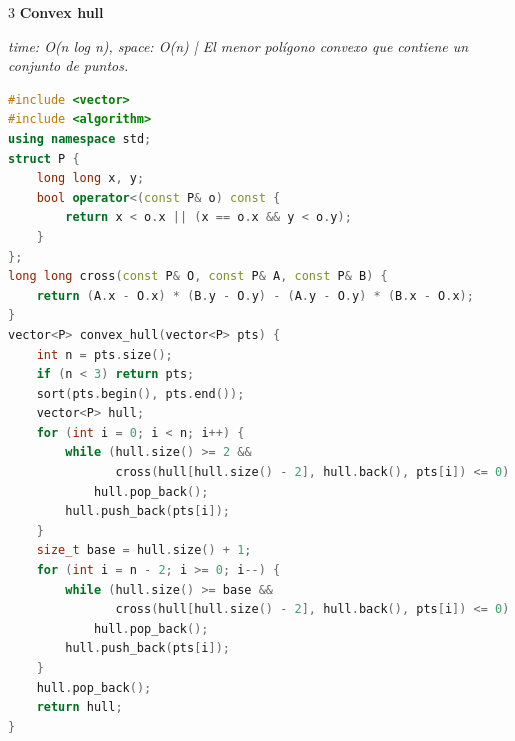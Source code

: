 \documentclass[8pt,a4paper,landscape]{extarticle}
\makeatletter
\newcommand{\csalgo}[1]{%
  \vspace{0.8ex}%
  {\bfseries\small #1}\par
  \vspace{0.4ex}{\color{cs@rule}\hrule height 0.4pt}\vspace{0.5ex}%
}
\newcommand{\csstats}[1]{{\scriptsize\itshape #1\par\vspace{0.3ex}}}
\makeatother
\begin{document}
\begin{multicols}{3}
\csalgo{Convex hull}
\csstats{time: O(n log n), space: O(n)  |  El menor polígono convexo que contiene un conjunto de puntos.}
\begin{lstlisting}[language=C++]
#include <vector>
#include <algorithm>
using namespace std;
struct P {
    long long x, y;
    bool operator<(const P& o) const {
        return x < o.x || (x == o.x && y < o.y);
    }
};
long long cross(const P& O, const P& A, const P& B) {
    return (A.x - O.x) * (B.y - O.y) - (A.y - O.y) * (B.x - O.x);
}
vector<P> convex_hull(vector<P> pts) {
    int n = pts.size();
    if (n < 3) return pts;
    sort(pts.begin(), pts.end());
    vector<P> hull;
    for (int i = 0; i < n; i++) {
        while (hull.size() >= 2 &&
               cross(hull[hull.size() - 2], hull.back(), pts[i]) <= 0)
            hull.pop_back();
        hull.push_back(pts[i]);
    }
    size_t base = hull.size() + 1;
    for (int i = n - 2; i >= 0; i--) {
        while (hull.size() >= base &&
               cross(hull[hull.size() - 2], hull.back(), pts[i]) <= 0)
            hull.pop_back();
        hull.push_back(pts[i]);
    }
    hull.pop_back();
    return hull;
}
\end{lstlisting}
\end{multicols}
\end{document}
